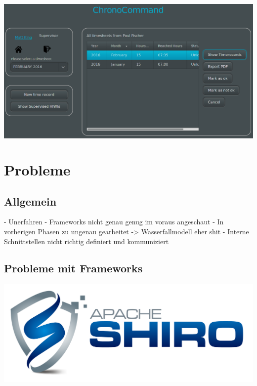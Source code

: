 \begin{frame}
	\begin{center}
		\includegraphics[width=\linewidth,height=0.9\textheight,keepaspectratio]{images/timesheets-overview.png}
	\end{center}
\end{frame}


\section{Probleme}

\subsection{Allgemein}
- Unerfahren
- Frameworks nicht genau genug im voraus angeschaut
- In vorherigen Phasen zu ungenau gearbeitet
-> Wasserfallmodell eher shit
- Interne Schnittstellen nicht richtig definiert und kommuniziert

\subsection{Probleme mit Frameworks}

\begin{frame}
	\includegraphics[width=\linewidth]{images/shiro-logo.png}
\end{frame}

